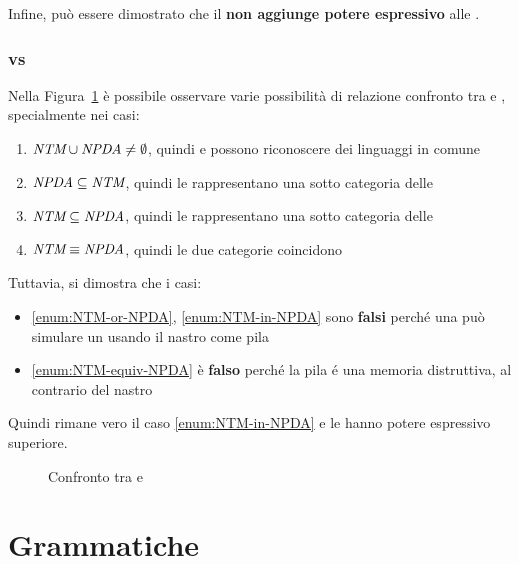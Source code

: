 \documentclass[italian, 10pt]{article}
\begin{document}
Infine, può essere dimostrato che il \ND \textbf{non aggiunge potere espressivo} alle \TM.

\subsubsection{\NPDA vs \NTM}

Nella Figura~\ref{fig:confronto-NPDA-NTM} è possibile osservare varie possibilità di relazione confronto tra \NPDA e \NTM, specialmente nei casi:

\begin{enumerate}[label=\alph*), ref=(\alph*)]
  \item \label{enum:NTM-or-NPDA} \(\textit{NTM} \cup\textit{NPDA} \neq \emptyset\), quindi \NTM e \NPDA possono riconoscere dei linguaggi in comune
  \item \label{enum:NPDA-in-NTM} \(\textit{NPDA} \subseteq \textit{NTM}\), quindi le \NTM rappresentano una sotto categoria delle \NPDA
  \item \label{enum:NTM-in-NPDA} \(\textit{NTM} \subseteq \textit{NPDA}\), quindi le \NPDA rappresentano una sotto categoria delle \NTM
  \item \label{enum:NTM-equiv-NPDA} \(\textit{NTM} \equiv \textit{NPDA}\), quindi le due categorie coincidono
\end{enumerate}

Tuttavia, si dimostra che i casi:

\begin{itemize}
  \item \ref{enum:NTM-or-NPDA}, \ref{enum:NTM-in-NPDA} sono \textbf{falsi} perché una \NTM può simulare un \NPDA usando il nastro come pila
  \item \ref{enum:NTM-equiv-NPDA} è \textbf{falso} perché la pila \'e una memoria distruttiva, al contrario del nastro
\end{itemize}

Quindi rimane vero il caso \ref{enum:NTM-in-NPDA} e le \NTM hanno potere espressivo superiore.

\begin{figure}[htbp]
  \bigskip
  \centering
  \caption{Confronto tra \NPDA e \NTM}
  \label{fig:confronto-NPDA-NTM}
  \bigskip
\end{figure}

\clearpage

\section{Grammatiche}
\label{sec:grammatiche}
\end{document}
